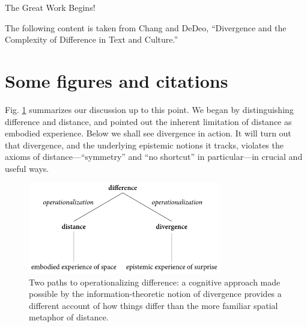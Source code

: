 The Great Work Begins!

The following content is taken from Chang and DeDeo, ``Divergence and the Complexity of Difference in Text and Culture.''

\section{Some figures and citations}

Fig. \ref{fig:operationalization_summary} summarizes our discussion up to this point. We began by distinguishing difference and distance, and pointed out the inherent limitation of distance as embodied experience. Below we shall see divergence in action. It will turn out that divergence, and the underlying epistemic notions it tracks, violates the axioms of distance---``symmetry'' and ``no shortcut'' in particular---in crucial and useful ways.

\begin{figure}[H]%
  \centering
  \includegraphics[width=0.75\textwidth]{fig/summary.pdf}
  \caption{Two paths to operationalizing difference: a cognitive approach made possible by the information-theoretic notion of divergence provides a different account of how things differ than the more familiar spatial metaphor of distance.}
  \label{fig:operationalization_summary}
\end{figure}


